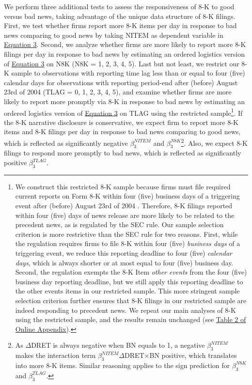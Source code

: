 \documentclass[a4paper]{article}
\begin{document}
\begin{spacing}{2}
We perform three additional tests to assess the responsiveness of 8-K to good versus bad news, taking advantage of the unique data structure of 8-K filings. First, we test whether firms report more 8-K items per day in response to bad news comparing to good news by taking NITEM as dependent variable in \hyperref[eq3]{Equation 3}. Second, we analyze whether firms are more likely to report more 8-K filings per day in response to bad news by estimating an ordered logistics version of \hyperref[eq3]{Equation 3} on N8K (N8K = 1, 2, 3, 4, 5). Last but not least, we restrict our 8-K sample to observations with reporting time lag less than or equal to four (five) calendar days for observations with reporting period-end after (before) August 23rd of 2004 (TLAG = 0, 1, 2, 3, 4, 5), and examine whether firms are more likely to report more promptly via 8-K in response to bad news by estimating an ordered logistics version of \hyperref[eq3]{Equation 3} on TLAG using the restricted sample\footnote{We construct this restricted 8-K sample because firms must file required current reports on Form 8-K within four (five) business days of a triggering event after (before) August 23rd of 2004 \citep*{secFinalRuleAdditional2004}. Therefore, 8-K filings reported within four (five) days of news release are more likely to be related to the precedent news, as is regulated by the SEC rule. Our sample selection criterion is more restrictive than the SEC rule for two reasons. First, while the regulation requires firms to file 8-K within four (five) \textit{business days} of a triggering event, we reduce this reporting deadline to four (five) \textit{calendar days}, which is always shorter or at most equal to four (five) business day. Second, the regulation exempts the 8-K Item \textit{other events} from the four (five) business day reporting deadline, but we still apply this reporting deadline to the other events items in our restricted sample. This more stringent sample selection criterion further ensures that 8-K filings in our restricted sample are indeed responding to precedent news. We repeat our main analyses of 8-K using the restricted sample, and the results remain unchanged (see \hyperref[oat2]{Table 2 of Online Appendix}). }. If the 8-K narrative disclosure is conservative, we expect firm to report more 8-K items and 8-K filings per day in response to bad news comparing to good news, which is reflected as significantly negative $\beta_3^{NITEM}$ and $\beta_3^{N8K}$\footnote{As $\Delta$DRET is always negative when BN equals to 1, a negative $\beta_3^{NITEM}$ makes the interaction term $\beta_3^{NITEM}$$\Delta$DRET$\times$BN positive, which translates into more 8-K items. Similar reasoning applies to the sign prediction for $\beta_3^{N8K}$ and $\beta_3^{TLAG}$.}. Also, we expect 8-K filings to respond more promptly to bad news, which is reflected as significantly positive $\beta_3^{TLAG}$.


\end{spacing}
\end{document}
